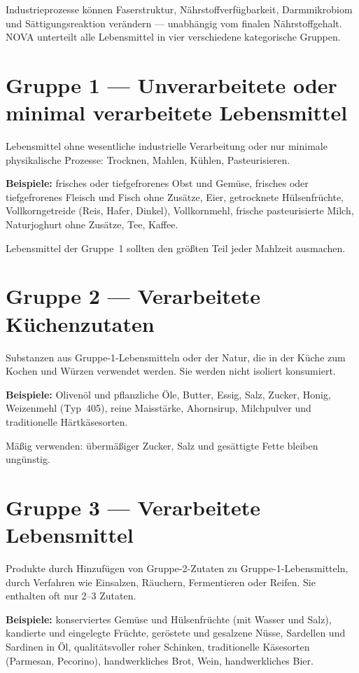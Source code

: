 \documentclass[a5paper,12pt,oneside,openany]{book}
\newcommand{\boxgruen}[2]{%
  \begin{tcolorbox}[kastenbase,
    colback=verdescuro!8!white, colframe=verdescuro, title={#1}]
  #2\end{tcolorbox}}
\begin{document}
Industrieprozesse k\"{o}nnen Faserstruktur, N\"{a}hrstoffverf\"{u}gbarkeit,
Darmmikrobiom und S\"{a}ttigungsreaktion ver\"{a}ndern --- unabh\"{a}ngig vom
finalen N\"{a}hrstoffgehalt. NOVA unterteilt alle Lebensmittel in vier
verschiedene kategorische Gruppen.

\section{Gruppe 1 --- Unverarbeitete oder minimal verarbeitete Lebensmittel}

Lebensmittel ohne wesentliche industrielle Verarbeitung oder nur minimale
physikalische Prozesse: Trocknen, Mahlen, K\"{u}hlen, Pasteurisieren.

\textbf{Beispiele:} frisches oder tiefgefrorenes Obst und Gem\"{u}se, frisches
oder tiefgefrorenes Fleisch und Fisch ohne Zus\"{a}tze, Eier, getrocknete
H\"{u}lsenfr\"{u}chte, Vollkorngetreide (Reis, Hafer, Dinkel), Vollkornmehl,
frische pasteurisierte Milch, Naturjoghurt ohne Zus\"{a}tze, Tee, Kaffee.

\boxgruen{Praktisches Ziel}{Lebensmittel der Gruppe~1 sollten den gr\"{o}{\ss}ten
Teil jeder Mahlzeit ausmachen.}

\section{Gruppe 2 --- Verarbeitete K\"{u}chenzutaten}

Substanzen aus Gruppe-1-Lebensmitteln oder der Natur, die in der K\"{u}che zum
Kochen und W\"{u}rzen verwendet werden. Sie werden nicht isoliert konsumiert.

\textbf{Beispiele:} Oliven\"{o}l und pflanzliche \"{O}le, Butter, Essig, Salz,
Zucker, Honig, Weizenmehl (Typ~405), reine Maisst\"{a}rke, Ahornsirup,
Milchpulver und traditionelle H\"{a}rtk\"{a}sesorten.

M\"{a}{\ss}ig verwenden: \"{u}berm\"{a}{\ss}iger Zucker, Salz und ges\"{a}ttigte
Fette bleiben ung\"{u}nstig.

\section{Gruppe 3 --- Verarbeitete Lebensmittel}

Produkte durch Hinzuf\"{u}gen von Gruppe-2-Zutaten zu Gruppe-1-Lebensmitteln,
durch Verfahren wie Einsalzen, R\"{a}uchern, Fermentieren oder Reifen.
Sie enthalten oft nur 2--3 Zutaten.

\textbf{Beispiele:} konserviertes Gem\"{u}se und H\"{u}lsenfr\"{u}chte (mit
Wasser und Salz), kandierte und eingelegte Fr\"{u}chte, ger\"{o}stete und
gesalzene N\"{u}sse, Sardellen und Sardinen in \"{O}l, qualit\"{a}tsvoller
roher Schinken, traditionelle K\"{a}sesorten (Parmesan, Pecorino), handwerkliches
Brot, Wein, handwerkliches Bier.
\end{document}
